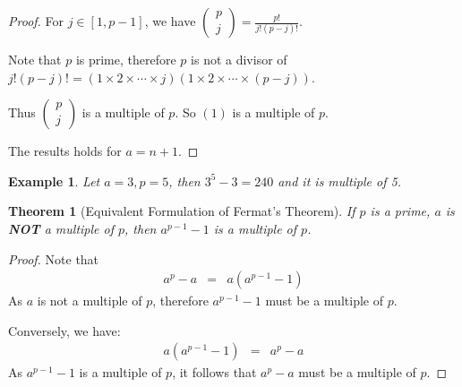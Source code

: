 \documentclass{article}
\theoremstyle{MyNonumberplain}
\theoremstyle{break}
\newtheorem*{proof}{Proof. }
\theoremstyle{break}
\newtheorem{theorem}{Theorem}[section]
\newtheorem{example}{Example}[section]
\theoremstyle{break}
\theoremstyle{definition}
\theoremstyle{break}
\begin{document}
\begin{thmbox}
\begin{prfbox}
\begin{proof}
            For $j \in [1, p - 1]$, we have $\left(\begin{array}{c}
              p\\
              j
            \end{array}\right) = \frac{p!}{j! (p - j) !}$.\bigskip
            
            Note that $p$ is prime, therefore $p$ is not a divisor of $j! (p - j) ! = (1
            \times 2 \times \cdots \times j) (1 \times 2 \times \cdots \times (p - j))$.\bigskip
            
            Thus $\left(\begin{array}{c}
              p\\
              j
            \end{array}\right)$ is a multiple of $p$. So $(1)$ is a multiple of $p$.\bigskip
            
            The results holds for $a = n + 1$.
        \end{proof}
    \end{prfbox}
\end{thmbox}

\begin{expbox}
    \begin{example}
        Let $a = 3, p = 5$, then $3^5 - 3 = 240$ and it is multiple of 5.
    \end{example}
\end{expbox}

\begin{thmbox}
    \begin{theorem}[Equivalent Formulation of Fermat's Theorem]
        If $p$ is a prime, $a$ is \textbf{NOT} a multiple of $p$, then $a^{p - 1} -
        1$ is a multiple of $p$.
    \end{theorem}
    \begin{prfbox}
        \begin{proof}
            Note that
            \begin{eqnarray*}
              a^p - a & = & a (a^{p - 1} - 1)
            \end{eqnarray*}
            As $a$ is not a multiple of $p$, therefore $a^{p - 1} - 1$ must be a multiple
            of $p$.\bigskip
            
            Conversely, we have:
            \begin{eqnarray*}
              a (a^{p - 1} - 1) & = & a^p - a
            \end{eqnarray*}
            As $a^{p - 1} - 1$ is a multiple of $p$, it follows that $a^p - a$ must be a
            multiple of $p$.
        \end{proof}
    \end{prfbox}
\end{thmbox}
\end{document}
